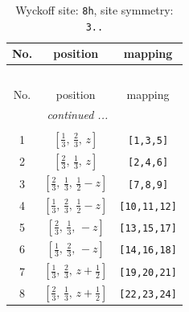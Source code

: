\documentclass[fleqn,8pt]{jsarticle}
\begin{document}
\begin{longtable}{ccc}
\caption{Wyckoff site: {\tt 8h}, site symmetry: {\tt 3..}}
 \\
 \hline \hline
No. & position & mapping \\ \hline \endfirsthead

\multicolumn{2}{l}{\tablename\ \thetable{}} \\
 \hline \hline
No. & position & mapping \\ \hline \endhead

 \hline \hline
\multicolumn{2}{r}{\footnotesize\it continued ...} \\ \endfoot

 \hline \hline
\multicolumn{2}{r}{} \\ \endlastfoot

1 & $\left[ \frac{1}{3},\, \frac{2}{3},\, z \right]$ & {\tt [1,3,5]} \\ \hline
2 & $\left[ \frac{2}{3},\, \frac{1}{3},\, z \right]$ & {\tt [2,4,6]} \\ \hline
3 & $\left[ \frac{2}{3},\, \frac{1}{3},\, \frac{1}{2} - z \right]$ & {\tt [7,8,9]} \\ \hline
4 & $\left[ \frac{1}{3},\, \frac{2}{3},\, \frac{1}{2} - z \right]$ & {\tt [10,11,12]} \\ \hline
5 & $\left[ \frac{2}{3},\, \frac{1}{3},\, - z \right]$ & {\tt [13,15,17]} \\ \hline
6 & $\left[ \frac{1}{3},\, \frac{2}{3},\, - z \right]$ & {\tt [14,16,18]} \\ \hline
7 & $\left[ \frac{1}{3},\, \frac{2}{3},\, z + \frac{1}{2} \right]$ & {\tt [19,20,21]} \\ \hline
8 & $\left[ \frac{2}{3},\, \frac{1}{3},\, z + \frac{1}{2} \right]$ & {\tt [22,23,24]} \\
\end{longtable}
\renewcommand{\arraystretch}{1.2}
\end{document}
